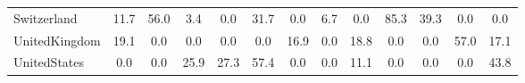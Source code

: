 \begin{table}[htbp]
\begin{tabular}{lcccccccccccc}
Switzerland &      11.7 &      56.0 &       3.4 &       0.0 &      31.7 &       0.0 &       6.7 &       0.0 &      85.3 &      39.3 &       0.0 &       0.0 \\  
UnitedKingdom &      19.1 &       0.0 &       0.0 &       0.0 &       0.0 &      16.9 &       0.0 &      18.8 &       0.0 &       0.0 &      57.0 &      17.1 \\  
UnitedStates &       0.0 &       0.0 &      25.9 &      27.3 &      57.4 &       0.0 &       0.0 &      11.1 &       0.0 &       0.0 &       0.0 &      43.8 \\  
\hline \hline \end{tabular}
\end{table}
